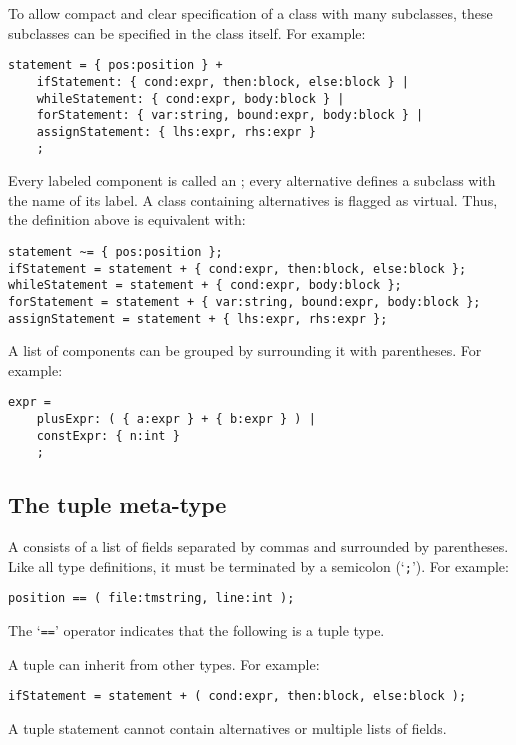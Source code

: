 To allow compact and clear specification of a class with many
subclasses, these subclasses can be specified in the class itself.
For example:
\begin{showfile}
\begin{verbatim}
statement = { pos:position } +
    ifStatement: { cond:expr, then:block, else:block } |
    whileStatement: { cond:expr, body:block } |
    forStatement: { var:string, bound:expr, body:block } |
    assignStatement: { lhs:expr, rhs:expr }
    ;
\end{verbatim}
\end{showfile}
Every labeled component is called an ;
every alternative defines a subclass with the name of its label.
A class containing alternatives is flagged as virtual.
Thus, the definition above is equivalent with:
\begin{showfile}
\begin{verbatim}
statement ~= { pos:position };
ifStatement = statement + { cond:expr, then:block, else:block };
whileStatement = statement + { cond:expr, body:block };
forStatement = statement + { var:string, bound:expr, body:block };
assignStatement = statement + { lhs:expr, rhs:expr };
\end{verbatim}
\end{showfile}

A list of components can be grouped by surrounding it with parentheses.
For example:
\begin{showfile}
\begin{verbatim}
expr =
    plusExpr: ( { a:expr } + { b:expr } ) |
    constExpr: { n:int }
    ;
\end{verbatim}
\end{showfile}
\subsection{The tuple meta-type}
A  consists of a list of fields separated by commas and
surrounded by parentheses.
Like all type definitions, it must be terminated by a semicolon (`\verb';'').
For example:
\begin{showfile}
\begin{verbatim}
position == ( file:tmstring, line:int );
\end{verbatim}
\end{showfile}
The `\verb'=='' operator indicates that the following is a tuple type.

A tuple can inherit from other types. For example:
\begin{showfile}
\begin{verbatim}
ifStatement = statement + ( cond:expr, then:block, else:block );
\end{verbatim}
\end{showfile}
A tuple statement cannot contain alternatives or multiple lists of fields.

